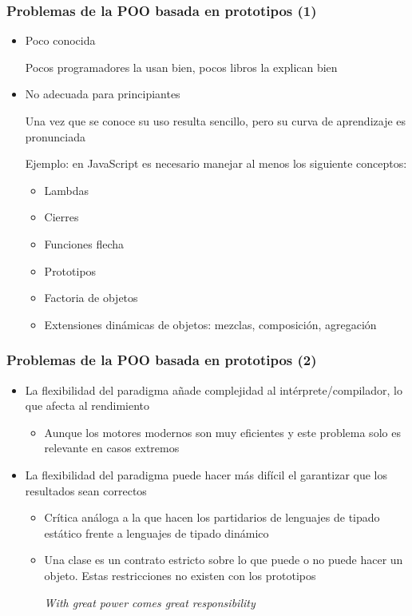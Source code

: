 \documentclass[ucs]{beamer}
\begin{document}
\begin{frame}[fragile]
\frametitle{Problemas de la POO basada en prototipos (1)}
\begin{itemize}
\item
Poco conocida

Pocos programadores la usan bien, pocos libros
la explican bien

\item
No adecuada para principiantes 

Una vez que se conoce su uso resulta
sencillo, pero su curva de aprendizaje es pronunciada

Ejemplo: en JavaScript es necesario manejar al menos los siguiente conceptos:

    \begin{itemize}
    \item
Lambdas
    \item
Cierres
    \item
Funciones flecha
    \item
Prototipos
    \item
Factoria de objetos
    \item
Extensiones dinámicas de objetos: mezclas, composición, agregación
    \end{itemize}
\end{itemize}
\end{frame}

\begin{frame}[fragile]
\frametitle{Problemas de la POO basada en prototipos (2)}
\begin{itemize}
\item
La flexibilidad del paradigma añade complejidad al intérprete/compilador,
lo que afecta al rendimiento

    \begin{itemize}
    \item
Aunque los motores modernos son muy eficientes y este problema solo es relevante
en casos extremos
    \end{itemize}

\item
La flexibilidad del paradigma puede hacer más difícil el garantizar que los
resultados sean correctos

    \begin{itemize}
    \item
Crítica análoga a la que hacen los partidarios de lenguajes de tipado
estático frente a lenguajes de tipado dinámico

    \item
Una clase es un contrato estricto sobre lo que puede o no puede hacer un
objeto. Estas restricciones no existen con los prototipos

\emph{With great power comes great responsibility}

    \end{itemize}
\end{itemize}
\end{frame}
\end{document}
